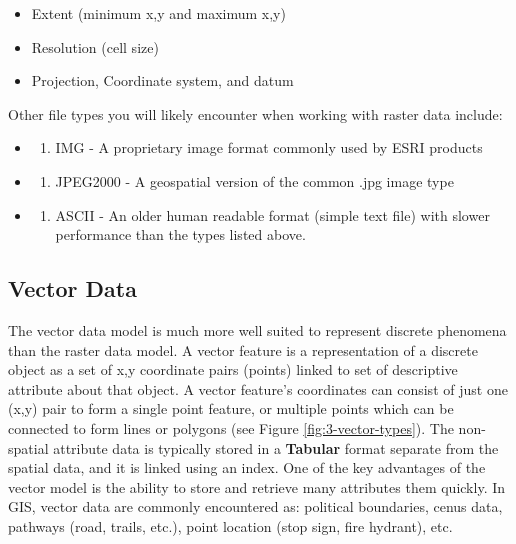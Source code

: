 \documentclass[
]{book}
\providecommand{\tightlist}{%
  \setlength{\itemsep}{0pt}\setlength{\parskip}{0pt}}
\begin{document}
\begin{itemize}
\tightlist
\item
  Extent (minimum x,y and maximum x,y)
\item
  Resolution (cell size)
\item
  Projection, Coordinate system, and datum
\end{itemize}

Other file types you will likely encounter when working with raster data include:

\begin{itemize}
\item
  \begin{enumerate}
  \def\labelenumi{\arabic{enumi})}
  \tightlist
  \item
    IMG - A proprietary image format commonly used by ESRI products
  \end{enumerate}
\item
  \begin{enumerate}
  \def\labelenumi{\arabic{enumi})}
  \setcounter{enumi}{1}
  \tightlist
  \item
    JPEG2000 - A geospatial version of the common .jpg image type
  \end{enumerate}
\item
  \begin{enumerate}
  \def\labelenumi{\arabic{enumi})}
  \setcounter{enumi}{2}
  \tightlist
  \item
    ASCII - An older human readable format (simple text file) with slower performance than the types listed above.
  \end{enumerate}
\end{itemize}

\hypertarget{vector-data}{%
\subsection{Vector Data}\label{vector-data}}

The vector data model is much more well suited to represent discrete phenomena than the raster data model. A vector feature is a representation of a discrete object as a set of x,y coordinate pairs (points) linked to set of descriptive attribute about that object. A vector feature's coordinates can consist of just one (x,y) pair to form a single point feature, or multiple points which can be connected to form lines or polygons (see Figure \ref{fig:3-vector-types}). The non-spatial attribute data is typically stored in a \textbf{Tabular} format separate from the spatial data, and it is linked using an index. One of the key advantages of the vector model is the ability to store and retrieve many attributes them quickly. In GIS, vector data are commonly encountered as: political boundaries, cenus data, pathways (road, trails, etc.), point location (stop sign, fire hydrant), etc.
\end{document}
